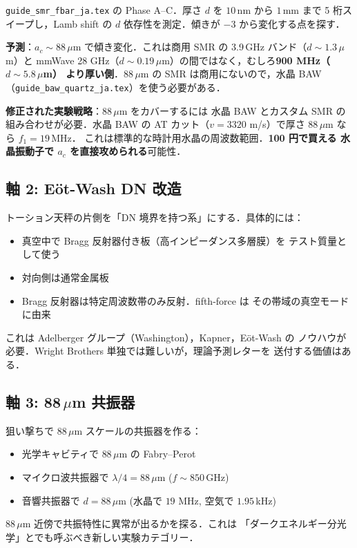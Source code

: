 \documentclass[11pt,a4paper]{article}
\begin{document}
\texttt{guide\_smr\_fbar\_ja.tex} の Phase A--C．厚さ $d$ を
$10$\,nm から $1$\,mm まで 5 桁スイープし，Lamb shift の
$d$ 依存性を測定．傾きが $-3$ から変化する点を探す．

\textbf{予測}：$a_c \sim 88\,\mu$m で傾き変化．これは商用 SMR の
3.9\,GHz バンド（$d \sim 1.3\,\mu$m）と mmWave 28 GHz（$d \sim
0.19\,\mu$m）の間ではなく，むしろ\textbf{900 MHz（$d\sim 5.8\,\mu$m）
より厚い側}．$88\,\mu$m の SMR は商用にないので，水晶 BAW
（\texttt{guide\_baw\_quartz\_ja.tex}）を使う必要がある．

\textbf{修正された実験戦略}：88\,$\mu$m をカバーするには
水晶 BAW とカスタム SMR の組み合わせが必要．水晶 BAW の
AT カット（$v=3320$ m/s）で厚さ $88\,\mu$m なら $f_1 = 19\,$MHz．
これは標準的な時計用水晶の周波数範囲．\textbf{100 円で買える
水晶振動子で $a_c$ を直接攻められる}可能性．

\subsection{軸 2: Eöt-Wash DN 改造}

トーション天秤の片側を「DN 境界を持つ系」にする．具体的には：
\begin{itemize}
\item 真空中で Bragg 反射器付き板（高インピーダンス多層膜）を
テスト質量として使う
\item 対向側は通常金属板
\item Bragg 反射器は特定周波数帯のみ反射．fifth-force は
その帯域の真空モードに由来
\end{itemize}

これは Adelberger グループ（Washington），Kapner，Eöt-Wash の
ノウハウが必要．Wright Brothers 単独では難しいが，理論予測レターを
送付する価値はある．

\subsection{軸 3: 88\,$\mu$m 共振器}

狙い撃ちで $88\,\mu$m スケールの共振器を作る：
\begin{itemize}
\item 光学キャビティで $88\,\mu$m の Fabry--Perot
\item マイクロ波共振器で $\lambda/4 = 88\,\mu$m ($f \sim 850$\,GHz)
\item 音響共振器で $d = 88\,\mu$m (水晶で $19$ MHz, 空気で
$1.95$\,kHz)
\end{itemize}

$88\,\mu$m 近傍で共振特性に異常が出るかを探る．これは
「ダークエネルギー分光学」とでも呼ぶべき新しい実験カテゴリー．
\end{document}
